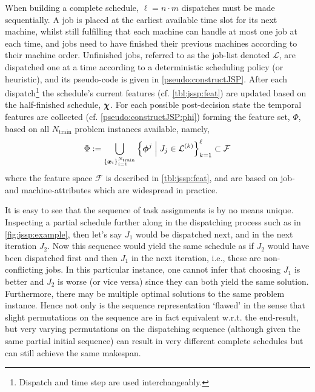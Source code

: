 \documentclass[smallextended]{svjour3}
\begin{document}
When building a complete schedule, $\ell=n\cdot m$ dispatches must be made 
sequentially.  A job is placed at the earliest available time slot for its next 
machine, whilst still fulfilling that each machine can handle at most one job 
at each time, and jobs need to have finished their previous machines according 
to their machine order. Unfinished jobs, referred to as the job-list denoted 
$\mathcal{L}$, are dispatched one at a time according to a deterministic 
scheduling policy (or heuristic), and its pseudo-code is given  in 
\cref{pseudo:constructJSP}. 
After each dispatch\footnote{Dispatch and time step are used interchangeably.} 
the schedule's current features (cf. \cref{tbl:jssp:feat}) are updated based on 
the half-finished schedule, $\bm \chi$. 
For each possible post-decision state the temporal features are collected (cf. 
\cref{pseudo:constructJSP:phi}) forming the feature set, $\Phi$, based on all 
$N_{\text{train}}$ problem instances available, namely, 
\begin{equation} \label{eq:Phi}
\Phi := \bigcup_{\{\vec{x}_i\}_{i=1}^{N_{\text{train}}}} 
\condset{\vphi^j}{J_j\in\mathcal{L}^{(k)}}_{k=1}^\ell
\subset\mathcal{F}
\end{equation}
where the feature space $\mathcal{F}$ is described in \cref{tbl:jssp:feat}, and 
are based on job- and machine-attributes which are widespread in practice.



It is easy to see that the sequence of task assignments is by no means unique. 
Inspecting a partial schedule further along in the dispatching process such as 
in \cref{fig:jssp:example}, then let's say $J_1$ would be dispatched next, and 
in the next iteration $J_2$. Now this sequence would yield the same schedule as 
if $J_2$ would have been dispatched first and then $J_1$ in the next iteration, 
i.e., these are non-conflicting jobs.  In this particular instance, one cannot 
infer that choosing $J_1$ is better and $J_2$ is worse (or vice versa) since
they can both yield the same solution. Furthermore, 
there may be multiple optimal solutions to the same 
problem instance. Hence not only is the sequence representation `flawed' in the 
sense that slight permutations on the sequence are in fact equivalent w.r.t. 
the end-result, but very varying permutations on the dispatching sequence 
(although given the same partial initial sequence) can result in very different 
complete schedules but can still achieve the same makespan. 
\end{document}
